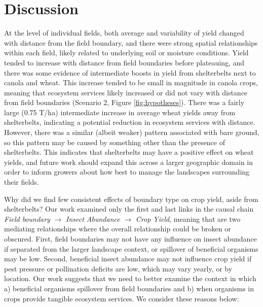 \documentclass[]{elsarticle} %
\begin{document}
\hypertarget{discussion}{%
\section{Discussion}\label{discussion}}

At the level of individual fields, both average and variability of yield changed with distance from the field boundary, and there were strong spatial relationships within each field, likely related to underlying soil or moisture conditions.
Yield tended to increase with distance from field boundaries before plateauing, and there was some evidence of intermediate boosts in yield from shelterbelts next to canola and wheat.
This increase tended to be small in magnitude in canola crops, meaning that ecosystem services likely increased or did not vary with distance from field boundaries (Scenario 2, Figure \ref{fig:hypotheses}).
There was a fairly large (0.75 T/ha) intermediate increase in average wheat yields away from shelterbelts, indicating a potential reduction in ecosystem services with distance.
However, there was a similar (albeit weaker) pattern associated with bare ground, so this pattern may be caused by something other than the presence of shelterbelts.
This indicates that shelterbelts may have a positive effect on wheat yields, and future work should expand this across a larger geographic domain in order to inform growers about how best to manage the landscapes surrounding their fields.

Why did we find few consistent effects of boundary type on crop yield, aside from shelterbelts?
Our work examined only the first and last links in the causal chain \emph{Field boundary} \(\rightarrow\) \emph{Insect Abundance} \(\rightarrow\) \emph{Crop Yield}, meaning that are two mediating relationships where the overall relationship could be broken or obscured.
First, field boundaries may not have any influence on insect abundance if separated from the larger landscape context, or spillover of beneficial organisms may be low.
Second, beneficial insect abundance may not influence crop yield if pest pressure or pollination deficits are low, which may vary yearly, or by location.
Our work suggests that we need to better examine the context in which a) beneficial organisms spillover from field boundaries and b) when organisms in crops provide tangible ecosystem services.
We consider these reasons below:
\end{document}
